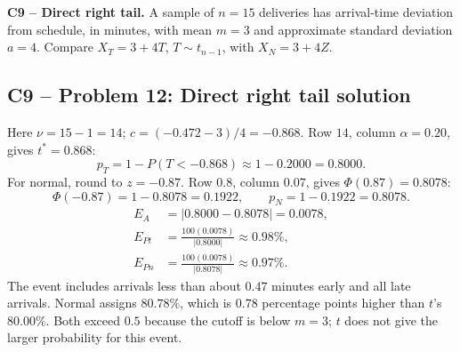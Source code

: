 {
\textbf{C9 -- Direct right tail.} A sample of $n=15$ deliveries has arrival-time deviation from schedule, in minutes, with mean $m=3$ and approximate standard deviation $a=4$. Compare $X_T=3+4T$, $T\sim t_{n-1}$, with $X_N=3+4Z$.
\label{sol:q12}
\subsection*{C9 -- Problem 12: Direct right tail solution }
Here $\nu=15-1=14$; $c=(-0.472-3)/4=-0.868$.
Row $14$, column $\alpha=0.20$, gives $t^*=0.868$:
\[
 p_T=1-P(T<-0.868)\approx1-0.2000=\boxed{0.8000}.
\]
For normal, round to $z=-0.87$.
Row $0.8$, column $0.07$, gives $\Phi(0.87)=0.8078$:
\[
 \Phi(-0.87)=1-0.8078=0.1922,\qquad p_N=1-0.1922=\boxed{0.8078}.
\]
\[
 \begin{aligned}
 E_A&=|0.8000-0.8078|=\boxed{0.0078},\\
 E_{Pt}&=\frac{100(0.0078)}{|0.8000|}\approx\boxed{0.98\%},\\
 E_{Pn}&=\frac{100(0.0078)}{|0.8078|}\approx\boxed{0.97\%}.
 \end{aligned}
\]
The event includes arrivals less than about $0.47$ minutes early and all late arrivals.
Normal assigns $80.78\%$, which is $0.78$ percentage points higher than $t$'s $80.00\%$.
Both exceed $0.5$ because the cutoff is below $m=3$; $t$ does not give the larger probability for this event.
\secInicio[sec:q12]
}


